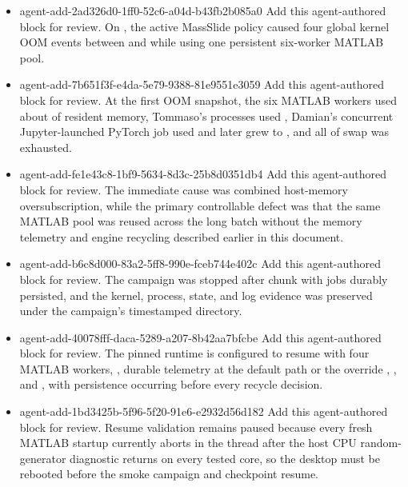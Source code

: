 \documentclass[11pt]{article}
\begin{document}
\begin{itemize}
  {Add this agent-authored block for review.}
  {}
  {On , serial and parallel materialization adopted the deterministic model name , prepared-workspace manifests advanced to version 3, legacy permanent artifacts remained readable, and 1,996 local snapshots were renamed without content changes.}
\item \agentProposedEdit
  {agent-add-2ad326d0-1ff0-52c6-a04d-b43fb2b085a0}
  {Add this agent-authored block for review.}
  {}
  {On , the active MassSlide policy  caused four global kernel OOM events between  and  while using one persistent six-worker MATLAB pool.}
\item \agentProposedEdit
  {agent-add-7b651f3f-e4da-5e79-9388-81e9551e3059}
  {Add this agent-authored block for review.}
  {}
  {At the first OOM snapshot, the six MATLAB workers used about  of resident memory, Tommaso's processes used , Damian's concurrent Jupyter-launched PyTorch job used  and later grew to , and all  of swap was exhausted.}
\item \agentProposedEdit
  {agent-add-fe1e43c8-1bf9-5634-8d3c-25b8d0351db4}
  {Add this agent-authored block for review.}
  {}
  {The immediate cause was combined host-memory oversubscription, while the primary controllable defect was that the same MATLAB pool was reused across the long batch without the memory telemetry and engine recycling described earlier in this document.}
\item \agentProposedEdit
  {agent-add-b6c8d000-83a2-5ff8-990e-fceb744e402c}
  {Add this agent-authored block for review.}
  {}
  {The campaign was stopped after chunk  with  jobs durably persisted, and the kernel, process, state, and log evidence was preserved under the campaign's timestamped  directory.}
\item \agentProposedEdit
  {agent-add-40078fff-daca-5289-a207-8b42aa7bfcbe}
  {Add this agent-authored block for review.}
  {}
  {The pinned runtime is configured to resume with four MATLAB workers, , durable telemetry at the default  path or the override , , and , with persistence occurring before every recycle decision.}
\item \agentProposedEdit
  {agent-add-1bd3425b-5f96-5f20-91e6-e2932d56d182}
  {Add this agent-authored block for review.}
  {}
  {Resume validation remains paused because every fresh MATLAB startup currently aborts in the  thread after the host CPU random-generator diagnostic returns  on every tested core, so the desktop must be rebooted before the smoke campaign and checkpoint resume.}
\end{itemize}
\end{document}
